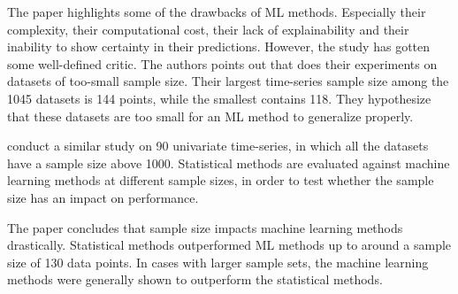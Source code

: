 The paper \cite{Makridakis2018} highlights some of the drawbacks of ML methods. Especially their complexity, their computational cost,
their lack of explainability and their inability to show certainty in their predictions.
However, the study has gotten some well-defined critic. The authors \citeauthor*{Cerqueira2019} points
out that \cite{Makridakis2018} does their experiments on datasets of too-small sample size.
Their largest time-series sample size among the 1045 datasets is 144 points, while the smallest contains 118.
They hypothesize that these datasets are too small for an ML method to generalize properly.

\cite{Cerqueira2019} conduct a similar study on 90 univariate time-series, in which
all the datasets have a sample size above 1000.
Statistical methods are evaluated against machine learning methods at different sample sizes,
in order to test whether the sample size has an impact on performance.

The paper \cite{Cerqueira2019} concludes that sample size impacts machine learning methods drastically.
Statistical methods outperformed ML methods up to around a sample size of 130 data points.
In cases with larger sample sets, the machine learning methods were generally shown to outperform the statistical methods.



